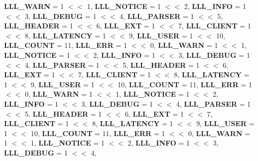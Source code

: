 \begin{DoxyCompactItemize}
{\bfseries L\+L\+L\+\_\+\+W\+A\+RN} = 1 $<$$<$ 1, 
{\bfseries L\+L\+L\+\_\+\+N\+O\+T\+I\+CE} = 1 $<$$<$ 2, 
{\bfseries L\+L\+L\+\_\+\+I\+N\+FO} = 1 $<$$<$ 3, 
{\bfseries L\+L\+L\+\_\+\+D\+E\+B\+UG} = 1 $<$$<$ 4, 
\newline
{\bfseries L\+L\+L\+\_\+\+P\+A\+R\+S\+ER} = 1 $<$$<$ 5, 
{\bfseries L\+L\+L\+\_\+\+H\+E\+A\+D\+ER} = 1 $<$$<$ 6, 
{\bfseries L\+L\+L\+\_\+\+E\+XT} = 1 $<$$<$ 7, 
{\bfseries L\+L\+L\+\_\+\+C\+L\+I\+E\+NT} = 1 $<$$<$ 8, 
\newline
{\bfseries L\+L\+L\+\_\+\+L\+A\+T\+E\+N\+CY} = 1 $<$$<$ 9, 
{\bfseries L\+L\+L\+\_\+\+U\+S\+ER} = 1 $<$$<$ 10, 
{\bfseries L\+L\+L\+\_\+\+C\+O\+U\+NT} = 11, 
{\bfseries L\+L\+L\+\_\+\+E\+RR} = 1 $<$$<$ 0, 
\newline
{\bfseries L\+L\+L\+\_\+\+W\+A\+RN} = 1 $<$$<$ 1, 
{\bfseries L\+L\+L\+\_\+\+N\+O\+T\+I\+CE} = 1 $<$$<$ 2, 
{\bfseries L\+L\+L\+\_\+\+I\+N\+FO} = 1 $<$$<$ 3, 
{\bfseries L\+L\+L\+\_\+\+D\+E\+B\+UG} = 1 $<$$<$ 4, 
\newline
{\bfseries L\+L\+L\+\_\+\+P\+A\+R\+S\+ER} = 1 $<$$<$ 5, 
{\bfseries L\+L\+L\+\_\+\+H\+E\+A\+D\+ER} = 1 $<$$<$ 6, 
{\bfseries L\+L\+L\+\_\+\+E\+XT} = 1 $<$$<$ 7, 
{\bfseries L\+L\+L\+\_\+\+C\+L\+I\+E\+NT} = 1 $<$$<$ 8, 
\newline
{\bfseries L\+L\+L\+\_\+\+L\+A\+T\+E\+N\+CY} = 1 $<$$<$ 9, 
{\bfseries L\+L\+L\+\_\+\+U\+S\+ER} = 1 $<$$<$ 10, 
{\bfseries L\+L\+L\+\_\+\+C\+O\+U\+NT} = 11, 
{\bfseries L\+L\+L\+\_\+\+E\+RR} = 1 $<$$<$ 0, 
\newline
{\bfseries L\+L\+L\+\_\+\+W\+A\+RN} = 1 $<$$<$ 1, 
{\bfseries L\+L\+L\+\_\+\+N\+O\+T\+I\+CE} = 1 $<$$<$ 2, 
{\bfseries L\+L\+L\+\_\+\+I\+N\+FO} = 1 $<$$<$ 3, 
{\bfseries L\+L\+L\+\_\+\+D\+E\+B\+UG} = 1 $<$$<$ 4, 
\newline
{\bfseries L\+L\+L\+\_\+\+P\+A\+R\+S\+ER} = 1 $<$$<$ 5, 
{\bfseries L\+L\+L\+\_\+\+H\+E\+A\+D\+ER} = 1 $<$$<$ 6, 
{\bfseries L\+L\+L\+\_\+\+E\+XT} = 1 $<$$<$ 7, 
{\bfseries L\+L\+L\+\_\+\+C\+L\+I\+E\+NT} = 1 $<$$<$ 8, 
\newline
{\bfseries L\+L\+L\+\_\+\+L\+A\+T\+E\+N\+CY} = 1 $<$$<$ 9, 
{\bfseries L\+L\+L\+\_\+\+U\+S\+ER} = 1 $<$$<$ 10, 
{\bfseries L\+L\+L\+\_\+\+C\+O\+U\+NT} = 11, 
{\bfseries L\+L\+L\+\_\+\+E\+RR} = 1 $<$$<$ 0, 
\newline
{\bfseries L\+L\+L\+\_\+\+W\+A\+RN} = 1 $<$$<$ 1, 
{\bfseries L\+L\+L\+\_\+\+N\+O\+T\+I\+CE} = 1 $<$$<$ 2, 
{\bfseries L\+L\+L\+\_\+\+I\+N\+FO} = 1 $<$$<$ 3, 
{\bfseries L\+L\+L\+\_\+\+D\+E\+B\+UG} = 1 $<$$<$ 4, 
\newline
$$
\end{DoxyCompactItemize}
